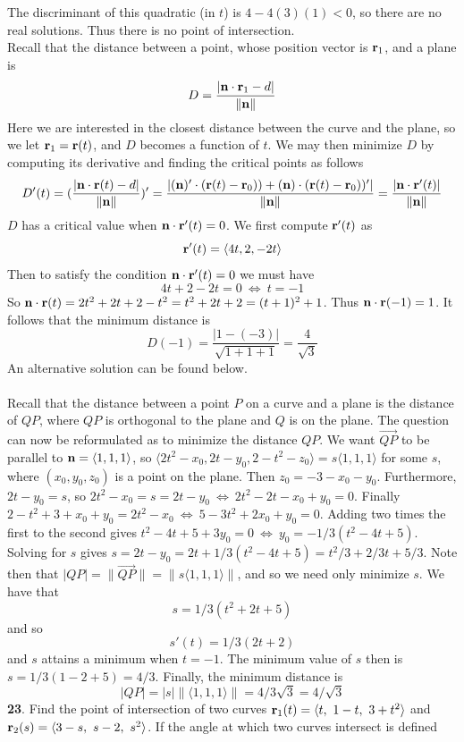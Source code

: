 \documentclass[12pt]{amsbook}
\newcommand{\la}{\langle}
\newcommand{\ra}{\rangle}
\begin{document}
The discriminant of this quadratic (in $t$) is $4-4(3)(1)<0$, so there are no real solutions. Thus there is no point of intersection. 
\\
Recall that the distance between a point, whose position vector is ${\bf r}_1$, and a plane is
$$D=\frac{|{\bf n}\cdot{\bf r}_1-d|}{\|{\bf n}\|}$$
Here we are interested in the closest distance between the curve and the plane, so we let ${\bf r}_1={\bf r}(t)$, and $D$ becomes a function of $t$. We may then minimize $D$ by computing its derivative and finding the critical points as follows
$$D'(t)=(\frac{|{\bf n}\cdot{\bf r}(t)-d|}{\|{\bf n}\|})'=\frac{|({\bf n})'\cdot({\bf r}(t)-{\bf r}_0))+({\bf n})\cdot({\bf r}(t)-{\bf r}_0))'|}{\|{\bf n}\|}=\frac{|{\bf n}\cdot{\bf r}'(t)|}{\|{\bf n}\|}$$
$D$ has a critical value when  ${\bf n}\cdot{\bf r}'(t)=0$. We first compute ${\bf r}'(t)$ as 
$${\bf r}'(t)=\la 4t,2,-2t \ra$$
Then to satisfy the condition ${\bf n}\cdot{\bf r}'(t)=0$ we must have
$$4t+2-2t=0 \ \Leftrightarrow \ t=-1$$
So ${\bf n}\cdot{\bf r}(t)=2t^2+2t+2-t^2=t^2+2t+2=(t+1)^2+1$. Thus ${\bf n}\cdot{\bf r}(-1)=1$. It follows that the minimum distance is
$$D(-1)=\frac{|1-(-3)|}{\sqrt{1+1+1}}=\frac{4}{\sqrt{3}}$$
An alternative solution can be found below.
\\
\\
Recall that the distance between a point $P$ on a curve and a plane is the distance of $QP$, where $QP$ is orthogonal to the plane and $Q$ is on the plane. The question can now be reformulated as to minimize the distance $QP$. We want $\overrightarrow{QP}$ to be parallel to ${\bf n}=\la 1,1,1\ra$, so $\la 2t^2-x_0, 2t-y_0, 2-t^2-z_0\ra=s\la 1,1,1 \ra$ for some $s$, where $(x_0,y_0,z_0)$ is a point on the plane. Then $z_0=-3-x_0-y_0$. Furthermore, $2t-y_0=s$, so $2t^2-x_0=s=2t-y_0 \ \Leftrightarrow \ 2t^2-2t-x_0+y_0=0$. Finally $2-t^2+3+x_0+y_0=2t^2-x_0 \ \Leftrightarrow \ 5-3t^2+2x_0+y_0=0$. Adding two times the first to the second gives $t^2-4t+5+3y_0=0 \ \Leftrightarrow \ y_0=-1/3(t^2-4t+5)$. Solving for $s$ gives $s=2t-y_0=2t+1/3(t^2-4t+5)=t^2/3+2/3t+5/3$. Note then that $|QP|=\|\overrightarrow{QP}\|=\|s\la 1,1,1 \ra\|$, and so we need only minimize $s$. We have that
$$s=1/3(t^2+2t+5)$$
and so 
$$s'(t)=1/3(2t+2)$$
and $s$ attains a minimum when $t=-1$. The minimum value of $s$ then is $s=1/3(1-2+5)=4/3$. Finally, the minimum distance is
$$|QP|=|s|\|\la 1,1,1 \ra \|=4/3\sqrt{3}=4/\sqrt{3}$$
{\small\bf 23}. Find the point of intersection of two curves ${\bf r}_1(t)=\la t, \ 1-t, \ 3+t^2 \ra$ and ${\bf r}_2(s)=\la 3-s, \ s-2, \ s^2 \ra$. If the angle at which two curves intersect is defined
\end{document}
